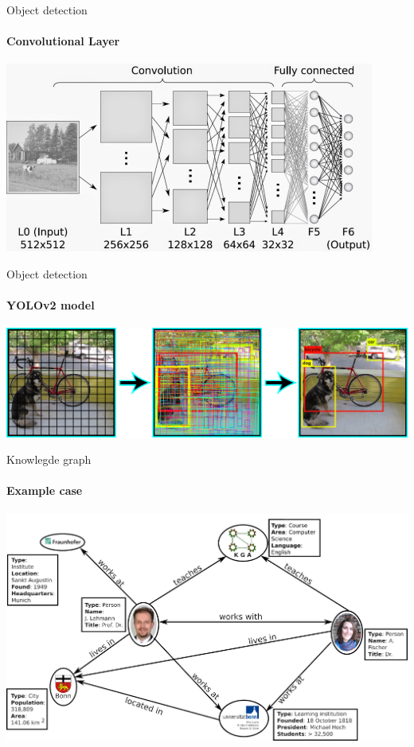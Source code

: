 \documentclass[aspectratio=169]{beamer}
\begin{document}
\begin{darkframes}
    \begin{frame}{Object detection}
      \framesubtitle{\alert{Convolutional Layer}}%
      \begin{center}
        \includegraphics[width=0.8\linewidth]{conv-layer}
      \end{center}
    \end{frame}   

    \begin{frame}{Object detection}
      \framesubtitle{\alert{YOLOv2 model}}%
      \begin{center}
        \includegraphics[width=\linewidth]{yolov2}
      \end{center}
    \end{frame}    

    \begin{frame}{Knowlegde graph}
      \framesubtitle{\alert{Example case}}%
      \begin{center}
        \includegraphics[width=0.8\linewidth]{know-graph-bgw}
      \end{center}
    \end{frame}    


\end{darkframes}
\end{document}
